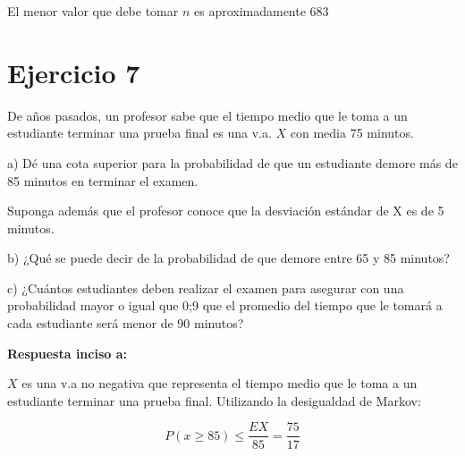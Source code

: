 \documentclass[10pt]{article}
\begin{document}
	\begin{flushleft}
		El menor valor que debe tomar $n$ es aproximadamente $683$
	\end{flushleft}






	\section*{Ejercicio 7 }

	\begin{flushleft}	
		De a\~nos pasados, un profesor sabe que el tiempo medio que le toma a un estudiante terminar una prueba final es una v.a. $X$ con media 75 minutos.
	\end{flushleft}

	\begin{flushleft}
		a) D\'e una cota superior para la probabilidad de que un estudiante demore m\'as de 85 minutos en terminar el examen.
	\end{flushleft}

	\begin{flushleft}
		Suponga adem\'as que el profesor conoce que la desviaci\'on est\'andar de X es de 5 minutos.
	\end{flushleft}

	\begin{flushleft}
		b) ¿Qu\'e se puede decir de la probabilidad de que demore entre 65 y 85 minutos?
	\end{flushleft}

	\begin{flushleft}
		c) ¿Cu\'antos estudiantes deben realizar el examen para asegurar con una probabilidad mayor o igual que 0;9 que el promedio del tiempo que le tomar\'a a cada estudiante ser\'a menor de 90 minutos?
	\end{flushleft}



	\begin{flushleft}
		{\bf Respuesta inciso  a:}
	\end{flushleft}

	\begin{flushleft}
		$X$ es una v.a no negativa que representa el tiempo medio que le toma a un estudiante terminar una prueba 
		final. Utilizando la desigualdad de Markov:
	\end{flushleft}

	\begin{equation*}
		P(x\geq 85)\leq \frac{EX}{85}=\frac{75}{17}
	\end{equation*}
\end{document}
